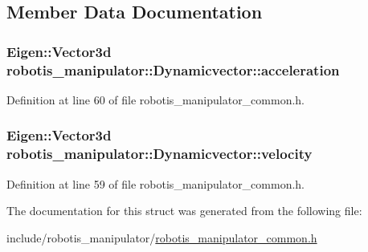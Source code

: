 \subsection{Member Data Documentation}
\subsubsection[{\texorpdfstring{acceleration}{acceleration}}]{\setlength{\rightskip}{0pt plus 5cm}Eigen\+::\+Vector3d robotis\+\_\+manipulator\+::\+Dynamicvector\+::acceleration}\hypertarget{structrobotis__manipulator_1_1_dynamicvector_afc83eba2d67af4c23150a08824f0f01e}{}\label{structrobotis__manipulator_1_1_dynamicvector_afc83eba2d67af4c23150a08824f0f01e}


Definition at line 60 of file robotis\+\_\+manipulator\+\_\+common.\+h.

\subsubsection[{\texorpdfstring{velocity}{velocity}}]{\setlength{\rightskip}{0pt plus 5cm}Eigen\+::\+Vector3d robotis\+\_\+manipulator\+::\+Dynamicvector\+::velocity}\hypertarget{structrobotis__manipulator_1_1_dynamicvector_a6bbccf8316887a8da3cd6aa065f3beac}{}\label{structrobotis__manipulator_1_1_dynamicvector_a6bbccf8316887a8da3cd6aa065f3beac}


Definition at line 59 of file robotis\+\_\+manipulator\+\_\+common.\+h.



The documentation for this struct was generated from the following file\+:\begin{DoxyCompactItemize}
\item 
include/robotis\+\_\+manipulator/\hyperlink{robotis__manipulator__common_8h}{robotis\+\_\+manipulator\+\_\+common.\+h}\end{DoxyCompactItemize}
